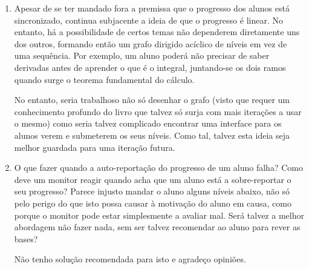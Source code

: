 \documentclass{article}
\begin{document}
	\begin{enumerate}
	\item Apesar de se ter mandado fora a premissa que o progresso dos alunos está sincronizado, continua subjacente a ideia de que o progresso é linear. No entanto, há a possibilidade de certos temas não dependerem diretamente uns dos outros, formando então um grafo dirigido acíclico de níveis em vez de uma sequência. Por exemplo, um aluno poderá não precisar de saber derivadas antes de aprender o que é o integral, juntando-se os dois ramos quando surge o teorema fundamental do cálculo.
	
	No entanto, seria trabalhoso não só desenhar o grafo (visto que requer um conhecimento profundo do livro que talvez só surja com mais iterações a usar o mesmo) como seria talvez complicado encontrar uma interface para os alunos verem e submeterem os seus níveis. Como tal, talvez esta ideia seja melhor guardada para uma iteração futura.
	
	\item O que fazer quando a auto-reportação do progresso de um aluno falha? Como deve um monitor reagir quando acha que um aluno está a sobre-reportar o seu progresso? Parece injusto mandar o aluno alguns níveis abaixo, não só pelo perigo do que isto possa causar à motivação do aluno em causa, como porque o monitor pode estar simplesmente a avaliar mal. Será talvez a melhor abordagem não fazer nada, sem ser talvez recomendar ao aluno para rever as bases?
	
	Não tenho solução recomendada para isto e agradeço opiniões.
	\end{enumerate}
\end{document}

